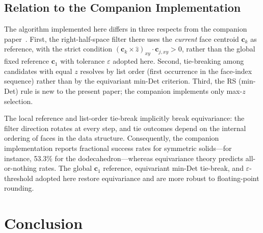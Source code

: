 \documentclass[12pt]{article}
\theoremstyle{definition}
\begin{document}
\subsection{Relation to the Companion Implementation}

The algorithm implemented here differs in three respects from the
companion paper~\cite{Yoshino2026arXiv}.
First, the right-half-space filter there uses the \emph{current} face
centroid $\mathbf{c}_k$ as reference, with the strict condition
$(\mathbf{c}_k \times \hat{z})_{xy}\cdot\mathbf{c}_{j,xy}>0$,
rather than the global fixed reference $\mathbf{c}_1$ with tolerance
$\varepsilon$ adopted here.
Second, tie-breaking among candidates with equal $z$ resolves by list
order (first occurrence in the face-index sequence) rather than by the
equivariant min-Det criterion.
Third, the RS (min-Det) rule is new to the present paper; the companion
implements only max-$z$ selection.

The local reference and list-order tie-break implicitly break equivariance:
the filter direction rotates at every step, and tie outcomes depend on the
internal ordering of faces in the data structure.
Consequently, the companion implementation reports fractional success rates
for symmetric solids---for instance, 53.3\% for the dodecahedron---whereas
equivariance theory predicts all-or-nothing rates.
The global $\mathbf{c}_1$ reference, equivariant min-Det tie-break, and
$\varepsilon$-threshold adopted here restore equivariance and are more
robust to floating-point rounding.

\section{Conclusion}
\end{document}
